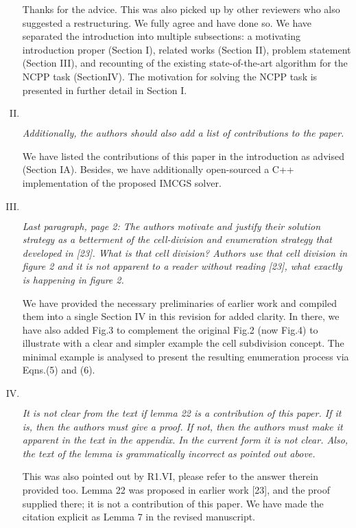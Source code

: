 \documentclass[11pt]{article}
\newenvironment{reviewer}
{\begin{mdframed}[roundcorner = 10pt,fontcolor=blue!70!black]\itshape}
{\end{mdframed}}
\begin{document}
\begin{enumerate}[I.]
\noindent
Thanks for the advice. This was also picked up by other reviewers who also suggested a restructuring. We fully agree and have done so. We have separated the introduction 
into multiple subsections: a motivating introduction proper (Section I), related works (Section II), problem statement (Section III), and recounting of the existing state-of-the-art algorithm for the NCPP task (SectionIV). 
The motivation for solving the NCPP task is presented in further detail in Section I. 

  \item $ $
  \begin{reviewer}
Additionally, the authors should also add a list of contributions to the paper. 
  \end{reviewer}

\noindent
We have listed the contributions of this paper in the introduction as advised (Section IA).
Besides, we have additionally open-sourced a C++ implementation of the proposed IMCGS solver. 

  \item $ $
  \begin{reviewer}
   Last paragraph, page 2: The authors motivate and justify their solution strategy as a betterment of the cell-division and enumeration strategy that developed in [23]. What is that cell division? Authors use that cell division in figure 2 and it is not apparent to a reader without reading [23], what exactly is happening in figure 2. 
   \end{reviewer}

\noindent
We have provided the necessary preliminaries of earlier work and compiled them into a single Section IV in this revision for added clarity. 
In there, we have also added Fig.3 to complement the original Fig.2 (now Fig.4) to illustrate with a clear and simpler example the cell subdivision concept. 
The minimal example is analysed to present the resulting enumeration process via Eqns.(5) and (6). 

  \item $ $
  \begin{reviewer}
   It is not clear from the text if lemma 22 is a contribution of this paper. If it is, then the authors must give a proof. If not, then the authors must make it apparent in the text in the appendix. In the current form it is not clear. Also, the text of the lemma is grammatically incorrect as pointed out above. 
   \end{reviewer}

\noindent
This was also pointed out by R1.VI, please refer to the answer therein provided too.
Lemma 22 was proposed in earlier work [23], and the proof supplied there; it is not a contribution of this paper. 
We have made the citation explicit as Lemma 7  in the revised manuscript. 


\end{enumerate}
\end{document}
